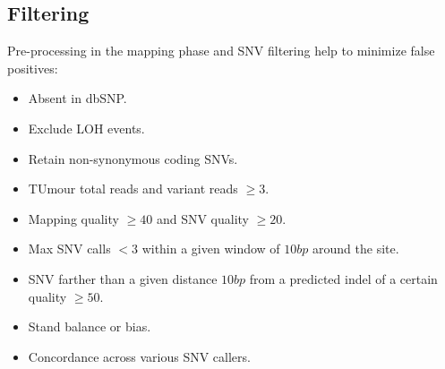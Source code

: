 	\subsection{Filtering}
	Pre-processing in the mapping phase and SNV filtering help to minimize false positives:

	\begin{multicols}{2}
		\begin{itemize}
			\item Absent in dbSNP.
			\item Exclude LOH events.
			\item Retain non-synonymous coding SNVs.
			\item TUmour total reads and variant reads $\ge 3$.
			\item Mapping quality $\ge 40$ and SNV quality $\ge 20$.
			\item Max SNV calls $<3$ within a given window of $10bp$ around the site.
			\item SNV farther than a given distance $10bp$ from a predicted indel of a certain quality $\ge 50$.
			\item Stand balance or bias.
			\item Concordance across various SNV callers.
		\end{itemize}
	\end{multicols}

